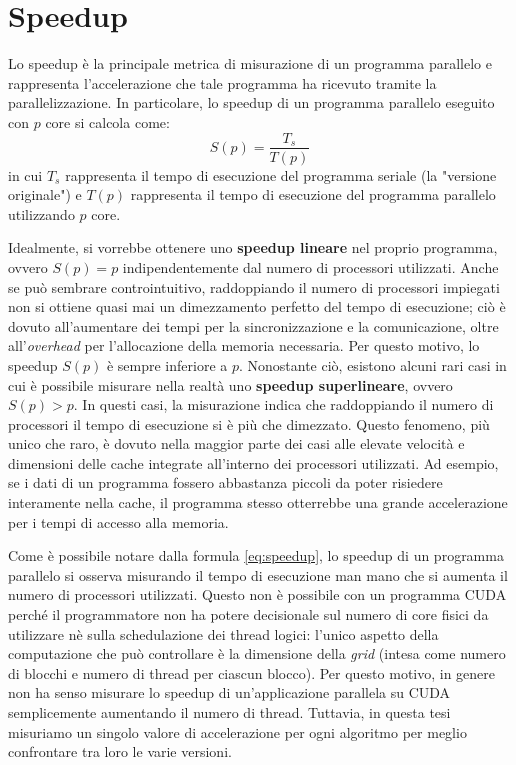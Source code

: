\documentclass[12pt,a4paper,oneside]{book}
\begin{document}
	\section{Speedup}
	Lo speedup è la principale metrica di misurazione di un programma parallelo e rappresenta l'accelerazione che tale programma ha ricevuto tramite la parallelizzazione. In particolare, lo speedup di un programma parallelo eseguito con $p$ core si calcola come:
	\begin{equation}
		S(p) = \frac{T_s}{T(p)}
		\label{eq:speedup}
	\end{equation}
	in cui $T_s$ rappresenta il tempo di esecuzione del programma seriale (la "versione originale") e $T(p)$ rappresenta il tempo di esecuzione del programma parallelo utilizzando $p$ core.
	
	Idealmente, si vorrebbe ottenere uno \textbf{speedup lineare} nel proprio programma, ovvero $S(p) = p$ indipendentemente dal numero di processori utilizzati. Anche se può sembrare controintuitivo, raddoppiando il numero di processori impiegati non si ottiene quasi mai un dimezzamento perfetto del tempo di esecuzione; ciò è dovuto all'aumentare dei tempi per la sincronizzazione e la comunicazione, oltre all'\textit{overhead} per l'allocazione della memoria necessaria. Per questo motivo, lo speedup $S(p)$ è sempre inferiore a $p$. Nonostante ciò, esistono alcuni rari casi in cui è possibile misurare nella realtà uno \textbf{speedup superlineare}, ovvero $S(p) > p$. In questi casi, la misurazione indica che raddoppiando il numero di processori il tempo di esecuzione si è più che dimezzato. Questo fenomeno, più unico che raro, è dovuto nella maggior parte dei casi alle elevate velocità e dimensioni delle cache integrate all'interno dei processori utilizzati. Ad esempio, se i dati di un programma fossero abbastanza piccoli da poter risiedere interamente nella cache, il programma stesso otterrebbe una grande accelerazione per i tempi di accesso alla memoria.
	
	Come è possibile notare dalla formula \ref{eq:speedup}, lo speedup di un programma parallelo si osserva misurando il tempo di esecuzione man mano che si aumenta il numero di processori utilizzati. Questo non è possibile con un programma CUDA perché il programmatore non ha potere decisionale sul numero di core fisici da utilizzare nè sulla schedulazione dei thread logici: l'unico aspetto della computazione che può controllare è la dimensione della \textit{grid} (intesa come numero di blocchi e numero di thread per ciascun blocco). Per questo motivo, in genere non ha senso misurare lo speedup di un'applicazione parallela su CUDA semplicemente aumentando il numero di thread. Tuttavia, in questa tesi misuriamo un singolo valore di accelerazione per ogni algoritmo per meglio confrontare tra loro le varie versioni.
	
\end{document}

